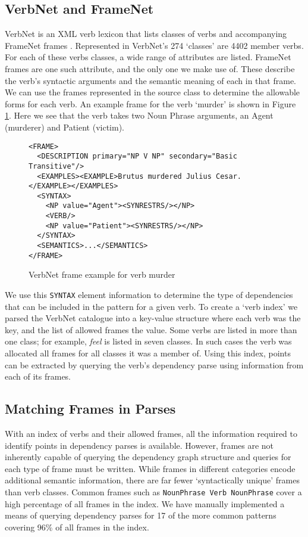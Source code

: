     \tocless\subsection{VerbNet and FrameNet}
      VerbNet is an XML verb lexicon that lists classes of verbs and accompanying FrameNet frames \cite{schuler2005verbnet,fillmore2002framenet}. Represented in VerbNet's 274 `classes' are 4402 member verbs. For each of these verbs classes, a wide range of attributes are listed. FrameNet frames are one such attribute, and the only one we make use of. These describe the verb's syntactic arguments and the semantic meaning of each in that frame. We can use the frames represented in the source class to determine the allowable forms for each verb. An example frame for the verb `murder' is shown in Figure \ref{fig:murder-frame}. Here we see that the verb takes two Noun Phrase arguments, an Agent (murderer) and Patient (victim).

      \begin{figure}
        \centering
        \caption{VerbNet frame example for verb murder}

        \begin{verbatim}
<FRAME>
  <DESCRIPTION primary="NP V NP" secondary="Basic Transitive"/>
  <EXAMPLES><EXAMPLE>Brutus murdered Julius Cesar.</EXAMPLE></EXAMPLES>
  <SYNTAX>
    <NP value="Agent"><SYNRESTRS/></NP>
    <VERB/>
    <NP value="Patient"><SYNRESTRS/></NP>
  </SYNTAX>
  <SEMANTICS>...</SEMANTICS>
</FRAME>
        \end{verbatim}
        \label{fig:murder-frame}
      \end{figure}

      We use this \texttt{SYNTAX} element information to determine the type of dependencies that can be included in the pattern for a given verb. To create a `verb index' we parsed the VerbNet catalogue into a key-value structure where each verb was the key, and the list of allowed frames the value. Some verbs are listed in more than one class; for example, \textit{feel} is listed in seven classes. In such cases the verb was allocated all frames for all classes it was a member of. Using this index, points can be extracted by querying the verb's dependency parse using information from each of its frames.

    \tocless\subsection{Matching Frames in Parses}
      With an index of verbs and their allowed frames, all the information required to identify points in dependency parses is available. However, frames are not inherently capable of querying the dependency graph structure and queries for each type of frame must be written. While frames in different categories encode additional semantic information, there are far fewer `syntactically unique' frames than verb classes. Common frames such as \texttt{NounPhrase Verb NounPhrase} cover a high percentage of all frames in the index. We have manually implemented a means of querying dependency parses for 17 of the more common patterns covering 96\% of all frames in the index.

